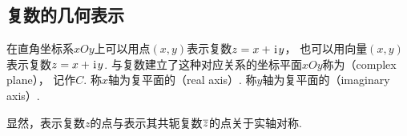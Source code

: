 \subsection{复数的几何表示}
\begin{definition}[复数在复平面上的几何表示]
在直角坐标系\(xOy\)上可以用点\((x,y)\)表示复数\(z=x+\kern1pt\mathrm{i}\kern1pt y\)，
也可以用向量\((x,y)\)表示复数\(z=x+\kern1pt\mathrm{i}\kern1pt y\).
与复数建立了这种对应关系的坐标平面\(xOy\)称为（complex plane），
记作\(C\).
称\(x\)轴为复平面的（real axis）.
称\(y\)轴为复平面的（imaginary axis）.

显然，表示复数\(z\)的点与表示其共轭复数\(\overline{z}\)的点关于实轴对称.
\end{definition}

